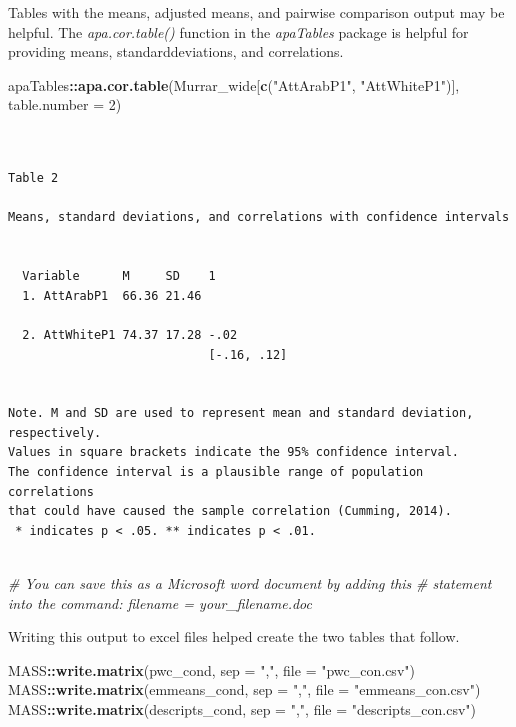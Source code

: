 \documentclass[
  11pt,
]{book}
\newenvironment{Shaded}{\begin{snugshade}}{\end{snugshade}}
\newcommand{\AttributeTok}[1]{\textcolor[rgb]{0.27,0.27,0.27}{#1}}
\newcommand{\CommentTok}[1]{\textcolor[rgb]{0.37,0.37,0.37}{\textit{#1}}}
\newcommand{\DecValTok}[1]{\textcolor[rgb]{0.06,0.06,0.06}{#1}}
\newcommand{\FunctionTok}[1]{\textcolor[rgb]{0.27,0.27,0.27}{\textbf{#1}}}
\newcommand{\NormalTok}[1]{#1}
\newcommand{\SpecialCharTok}[1]{\textcolor[rgb]{0.43,0.43,0.43}{\textbf{#1}}}
\newcommand{\StringTok}[1]{\textcolor[rgb]{0.5,0.5,0.5}{#1}}
\begin{document}
Tables with the means, adjusted means, and pairwise comparison output may be helpful. The \emph{apa.cor.table()} function in the \emph{apaTables} package is helpful for providing means, standarddeviations, and correlations.

\begin{Shaded}
\begin{Highlighting}[]
\NormalTok{apaTables}\SpecialCharTok{::}\FunctionTok{apa.cor.table}\NormalTok{(Murrar\_wide[}\FunctionTok{c}\NormalTok{(}\StringTok{"AttArabP1"}\NormalTok{, }\StringTok{"AttWhiteP1"}\NormalTok{)], }\AttributeTok{table.number =} \DecValTok{2}\NormalTok{)}
\end{Highlighting}
\end{Shaded}

\begin{verbatim}


Table 2 

Means, standard deviations, and correlations with confidence intervals
 

  Variable      M     SD    1          
  1. AttArabP1  66.36 21.46            
                                       
  2. AttWhiteP1 74.37 17.28 -.02       
                            [-.16, .12]
                                       

Note. M and SD are used to represent mean and standard deviation, respectively.
Values in square brackets indicate the 95% confidence interval.
The confidence interval is a plausible range of population correlations 
that could have caused the sample correlation (Cumming, 2014).
 * indicates p < .05. ** indicates p < .01.
 
\end{verbatim}

\begin{Shaded}
\begin{Highlighting}[]
\CommentTok{\# You can save this as a Microsoft word document by adding this}
\CommentTok{\# statement into the command: filename = \textquotesingle{}your\_filename.doc\textquotesingle{}}
\end{Highlighting}
\end{Shaded}

Writing this output to excel files helped create the two tables that follow.

\begin{Shaded}
\begin{Highlighting}[]
\NormalTok{MASS}\SpecialCharTok{::}\FunctionTok{write.matrix}\NormalTok{(pwc\_cond, }\AttributeTok{sep =} \StringTok{","}\NormalTok{, }\AttributeTok{file =} \StringTok{"pwc\_con.csv"}\NormalTok{)}
\NormalTok{MASS}\SpecialCharTok{::}\FunctionTok{write.matrix}\NormalTok{(emmeans\_cond, }\AttributeTok{sep =} \StringTok{","}\NormalTok{, }\AttributeTok{file =} \StringTok{"emmeans\_con.csv"}\NormalTok{)}
\NormalTok{MASS}\SpecialCharTok{::}\FunctionTok{write.matrix}\NormalTok{(descripts\_cond, }\AttributeTok{sep =} \StringTok{","}\NormalTok{, }\AttributeTok{file =} \StringTok{"descripts\_con.csv"}\NormalTok{)}
\end{Highlighting}
\end{Shaded}
\end{document}

